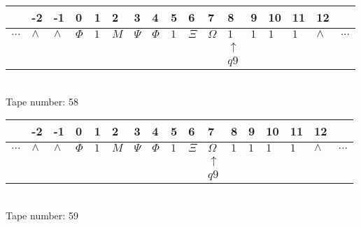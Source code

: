 \documentclass{article}
\begin{document}
\begin{table}[H]
\centering
\begin{tabular}{lllllllllllllllll}
 & -2 & -1 & 0 & 1 & 2 & 3 & 4 & 5 & 6 & 7 & 8 & 9 & 10 & 11 & 12 & \\
\hline
$...$ & \multicolumn{1}{|l|}{$\wedge$} & \multicolumn{1}{|l|}{$\wedge$} & \multicolumn{1}{|l|}{$\Phi$} & \multicolumn{1}{|l|}{$1$} & \multicolumn{1}{|l|}{$M$} & \multicolumn{1}{|l|}{$\Psi$} & \multicolumn{1}{|l|}{$\Phi$} & \multicolumn{1}{|l|}{$1$} & \multicolumn{1}{|l|}{$\Xi$} & \multicolumn{1}{|l|}{$\Omega$} & \multicolumn{1}{|l|}{$1$} & \multicolumn{1}{|l|}{$1$} & \multicolumn{1}{|l|}{$1$} & \multicolumn{1}{|l|}{$1$} & \multicolumn{1}{|l|}{$\wedge$} & $...$\\
\hline
&  &  &  &  &  &  &  &  &  &  & $\uparrow$ &  &  &  &  &  \\
&  &  &  &  &  &  &  &  &  &  & $ q9 $ &  &  &  &  &  \\
\end{tabular}
\\
Tape number: 58
\noindent\makebox[\linewidth]{\hdashrule{\textwidth}{1pt}{1pt}}\end{table}

\begin{table}[H]
\centering
\begin{tabular}{lllllllllllllllll}
 & -2 & -1 & 0 & 1 & 2 & 3 & 4 & 5 & 6 & 7 & 8 & 9 & 10 & 11 & 12 & \\
\hline
$...$ & \multicolumn{1}{|l|}{$\wedge$} & \multicolumn{1}{|l|}{$\wedge$} & \multicolumn{1}{|l|}{$\Phi$} & \multicolumn{1}{|l|}{$1$} & \multicolumn{1}{|l|}{$M$} & \multicolumn{1}{|l|}{$\Psi$} & \multicolumn{1}{|l|}{$\Phi$} & \multicolumn{1}{|l|}{$1$} & \multicolumn{1}{|l|}{$\Xi$} & \multicolumn{1}{|l|}{$\Omega$} & \multicolumn{1}{|l|}{$1$} & \multicolumn{1}{|l|}{$1$} & \multicolumn{1}{|l|}{$1$} & \multicolumn{1}{|l|}{$1$} & \multicolumn{1}{|l|}{$\wedge$} & $...$\\
\hline
&  &  &  &  &  &  &  &  &  & $\uparrow$ &  &  &  &  &  &  \\
&  &  &  &  &  &  &  &  &  & $ q9 $ &  &  &  &  &  &  \\
\end{tabular}
\\
Tape number: 59
\noindent\makebox[\linewidth]{\hdashrule{\textwidth}{1pt}{1pt}}\end{table}
\clearpage
\end{document}
